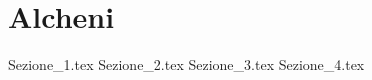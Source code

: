 \chapter{Alcheni}\label{chp:alcheni}

{Sezione_1.tex} %
{Sezione_2.tex} %
{Sezione_3.tex} %
{Sezione_4.tex} %